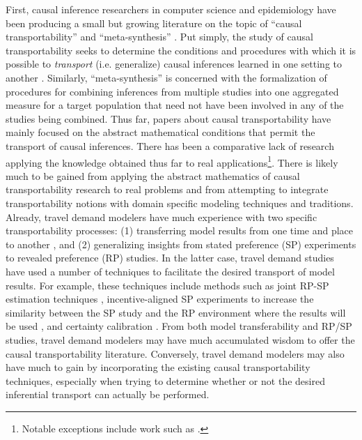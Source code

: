 First, causal inference researchers in computer science and epidemiology have been producing a small but growing literature on the topic of ``causal transportability'' and ``meta-synthesis'' \citep{hernan_2011_compound, petersen_2011_compound, pearl_2011_transportability, bareinboim_2012_transportability, pearl_2012_calculus, lee_2013_m, bareinboim_2013_transportability, singleton_2014_motivating, bareinboim_2014_transportability}. Put simply, the study of causal transportability seeks to determine the conditions and procedures with which it is possible to \textit{transport} (i.e. generalize) causal inferences learned in one setting to another \citep{pearl_2011_transportability, pearl_2014_external}. Similarly, ``meta-synthesis'' \citep{pearl_2012_calculus, lee_2013_m, bareinboim_2013_transportability, bareinboim_2014_transportability} is concerned with the formalization of procedures for combining inferences from multiple studies into one aggregated measure for a target population that need not have been involved in any of the studies being combined. Thus far, papers about causal transportability have mainly focused on the abstract mathematical conditions that permit the transport of causal inferences. There has been a comparative lack of research applying the knowledge obtained thus far to real applications\footnote{Notable exceptions include work such as \citet{singleton_2014_motivating}.}. There is likely much to be gained from applying the abstract mathematics of causal transportability research to real problems and from attempting to integrate transportability notions with domain specific modeling techniques and traditions. Already, travel demand modelers have much experience with two specific transportability processes: (1) transferring model results from one time and place to another \citep{agyemang_1997_spatial, fox_2015_temporal}, and (2) generalizing insights from stated preference (SP) experiments to revealed preference (RP) studies. In the latter case, travel demand studies have used a number of techniques to facilitate the desired transport of model results. For example, these techniques include methods such as joint RP-SP estimation techniques \citep{brownstone_2000_joint, feit_2010_reality}, incentive-aligned SP experiments to increase the similarity between the SP study and the RP environment where the results will be used \citep{ding_2005_incentive, ding_2007_incentive, moser_2010_using, chung_2017_willingness}, and certainty calibration \citep{beck_2016_can}. From both model transferability and RP/SP studies, travel demand modelers may have much accumulated wisdom to offer the causal transportability literature. Conversely, travel demand modelers may also have much to gain by incorporating the existing causal transportability techniques, especially when trying to determine whether or not the desired inferential transport can actually be performed.

